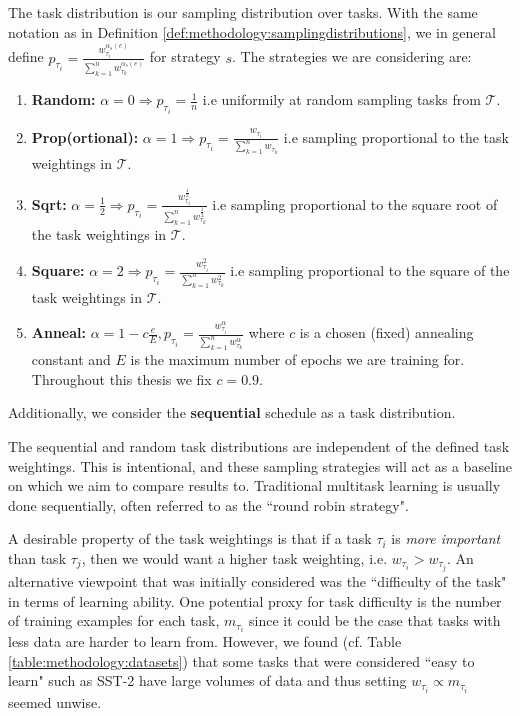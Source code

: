 \begin{definition} \label{def:methodology:taskdistributions}
	The task distribution is our sampling distribution over tasks. With the same notation as in Definition \ref{def:methodology:samplingdistributions}, we in general define $p_{\tau_i} = \frac{w_{\tau_i}^{\alpha_s (e)}}{\sum \limits_{k=1}^{n} w_{\tau_k}^{\alpha_s (e)}}$ for strategy $s$. The strategies we are considering are:
	\begin{enumerate}
		\item \textbf{Random:} $\alpha = 0 \Rightarrow p_{\tau_i} = \frac{1}{n}$ i.e uniformily at random sampling tasks from $\mathcal{T}$.
		\item \textbf{Prop(ortional):} $\alpha = 1 \Rightarrow p_{\tau_i} = \frac{w_{\tau_i}}{\sum \limits_{k=1}^{n} w_{\tau_k}}$ i.e sampling proportional to the task weightings in $\mathcal{T}$.
		\item \textbf{Sqrt:} $\alpha = \frac{1}{2} \Rightarrow p_{\tau_i} = \frac{w_{\tau_i}^{\frac{1}{2}}}{\sum \limits_{k=1}^{n} w_{\tau_k}^{\frac{1}{2}}}$ i.e sampling proportional to the square root of the task weightings in $\mathcal{T}$.
		\item \textbf{Square:} $\alpha = 2 \Rightarrow p_{\tau_i} = \frac{w_{\tau_i}^2}{\sum \limits_{k=1}^{n} w_{\tau_k}^2}$ i.e sampling proportional to the square of the task weightings in $\mathcal{T}$.
		\item \textbf{Anneal:} $\alpha = 1 - c\frac{e}{E},  p_{\tau_i} = \frac{w_{\tau_i}^\alpha}{{\sum \limits_{k=1}^{n} w_{\tau_k}^{\alpha}}}$ where $c$ is a chosen (fixed) annealing constant and $E$ is the maximum number of epochs we are training for. Throughout this thesis we fix $c=0.9$.
	\end{enumerate}
	Additionally, we consider the \textbf{sequential} schedule as a task distribution.
\end{definition}

\begin{remark}
	The sequential and random task distributions are independent of the defined task weightings. This is intentional, and these sampling strategies will act as a baseline on which we aim to compare results to. Traditional multitask learning is usually done sequentially, often referred to as the ``round robin strategy".
\end{remark}

A desirable property of the task weightings is that if a task $\tau_i$ is \textit{more important} than task $\tau_j$, then we would want a higher task weighting, i.e. $w_{\tau_i} > w_{\tau_j}$. An alternative viewpoint that was initially considered was the ``difficulty of the task" in terms of learning ability. One potential proxy for task difficulty is the number of training examples for each task, $m_{\tau_i}$ since it could be the case that tasks with less data are harder to learn from. However, we found (cf. Table \ref{table:methodology:datasets}) that some tasks that were considered ``easy to learn" such as SST-2 have large volumes of data and thus setting $w_{\tau_i} \propto m_{\tau_i}$ seemed unwise.

